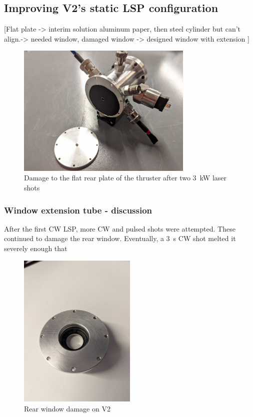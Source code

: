     \subsection{Improving V2's static LSP configuration}

        [Flat plate -> interim solution aluminum paper, then steel cylinder but can't align.-> needed window, damaged window -> designed window with extension ]

        \begin{figure}[!ht]
            \centering
            \includegraphics[width=0.75\textwidth]{assets/4 experiments/V2 test damage.jpg}
            \caption{Damage to the flat rear plate of the thruster after two \qty{3}{kW} laser shots}
        \end{figure}

        \subsubsection{Window extension tube - discussion}
        
        After the first CW LSP, more CW and pulsed shots were attempted. These continued to damage the rear window. Eventually, a \qty{3}{s} CW shot melted it severely enough that 

        \begin{figure}[!ht]
            \centering
            \includegraphics[width=0.5\textwidth]{assets/4 experiments/window damage.jpg}
            \caption{Rear window damage on V2}
        \end{figure}

